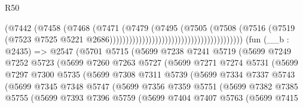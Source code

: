 \begin{lexlean}{R50}
\begin{coremodule}
                                                                (@7442
                                                                  (@7458
                                                                    (@7468
                                                                      (@7471
                                                                        (@7479
                                                                          (@7495
                                                                            (@7505
                                                                              (@7508
                                                                                (@7516
                                                                                  (@7519
                                                                                    (@7523
                                                                                      @7525
                                                                                      @5221
                                                                                      @2686)))))))))))))))))))))))))))))))))))))))))
    (fun (__b : @2435) =>
    @2547
      (@5701
        @5715
        (@5699
          @7238
          @7241
          @5719
          (@5699
            @7249
            @7252
            @5723
            (@5699
              @7260
              @7263
              @5727
              (@5699
                @7271
                @7274
                @5731
                (@5699
                  @7297
                  @7300
                  @5735
                  (@5699
                    @7308
                    @7311
                    @5739
                    (@5699
                      @7334
                      @7337
                      @5743
                      (@5699
                        @7345
                        @7348
                        @5747
                        (@5699
                          @7356
                          @7359
                          @5751
                          (@5699
                            @7382
                            @7385
                            @5755
                            (@5699
                              @7393
                              @7396
                              @5759
                              (@5699
                                @7404
                                @7407
                                @5763
                                (@5699
                                  @7415

\end{coremodule}
\end{lexlean}

